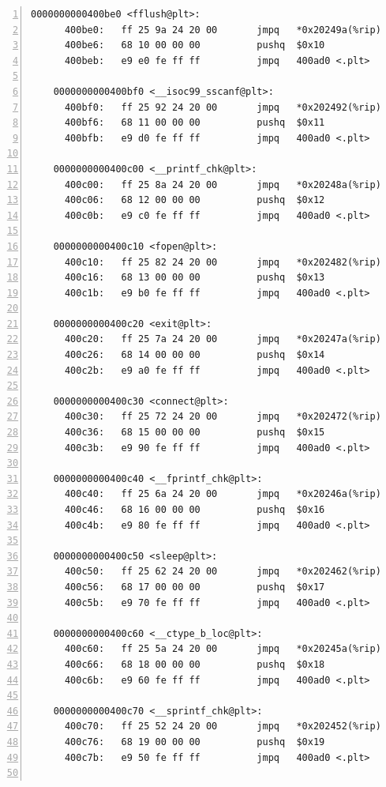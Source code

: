 \documentclass{article}
\begin{document}
\begin{lstlisting}[title = bomb的反汇编代码及部分注释, xleftmargin = 2em,xrightmargin = 2em, aboveskip = 1em, numbers = left, basicstyle=\scriptsize\ttfamily, numberstyle=\scriptsize]
    0000000000400be0 <fflush@plt>:
      400be0:	ff 25 9a 24 20 00    	jmpq   *0x20249a(%rip)        # 603080 <fflush@GLIBC_2.2.5>
      400be6:	68 10 00 00 00       	pushq  $0x10
      400beb:	e9 e0 fe ff ff       	jmpq   400ad0 <.plt>
    
    0000000000400bf0 <__isoc99_sscanf@plt>:
      400bf0:	ff 25 92 24 20 00    	jmpq   *0x202492(%rip)        # 603088 <__isoc99_sscanf@GLIBC_2.7>
      400bf6:	68 11 00 00 00       	pushq  $0x11
      400bfb:	e9 d0 fe ff ff       	jmpq   400ad0 <.plt>
    
    0000000000400c00 <__printf_chk@plt>:
      400c00:	ff 25 8a 24 20 00    	jmpq   *0x20248a(%rip)        # 603090 <__printf_chk@GLIBC_2.3.4>
      400c06:	68 12 00 00 00       	pushq  $0x12
      400c0b:	e9 c0 fe ff ff       	jmpq   400ad0 <.plt>
    
    0000000000400c10 <fopen@plt>:
      400c10:	ff 25 82 24 20 00    	jmpq   *0x202482(%rip)        # 603098 <fopen@GLIBC_2.2.5>
      400c16:	68 13 00 00 00       	pushq  $0x13
      400c1b:	e9 b0 fe ff ff       	jmpq   400ad0 <.plt>
    
    0000000000400c20 <exit@plt>:
      400c20:	ff 25 7a 24 20 00    	jmpq   *0x20247a(%rip)        # 6030a0 <exit@GLIBC_2.2.5>
      400c26:	68 14 00 00 00       	pushq  $0x14
      400c2b:	e9 a0 fe ff ff       	jmpq   400ad0 <.plt>
    
    0000000000400c30 <connect@plt>:
      400c30:	ff 25 72 24 20 00    	jmpq   *0x202472(%rip)        # 6030a8 <connect@GLIBC_2.2.5>
      400c36:	68 15 00 00 00       	pushq  $0x15
      400c3b:	e9 90 fe ff ff       	jmpq   400ad0 <.plt>
    
    0000000000400c40 <__fprintf_chk@plt>:
      400c40:	ff 25 6a 24 20 00    	jmpq   *0x20246a(%rip)        # 6030b0 <__fprintf_chk@GLIBC_2.3.4>
      400c46:	68 16 00 00 00       	pushq  $0x16
      400c4b:	e9 80 fe ff ff       	jmpq   400ad0 <.plt>
    
    0000000000400c50 <sleep@plt>:
      400c50:	ff 25 62 24 20 00    	jmpq   *0x202462(%rip)        # 6030b8 <sleep@GLIBC_2.2.5>
      400c56:	68 17 00 00 00       	pushq  $0x17
      400c5b:	e9 70 fe ff ff       	jmpq   400ad0 <.plt>
    
    0000000000400c60 <__ctype_b_loc@plt>:
      400c60:	ff 25 5a 24 20 00    	jmpq   *0x20245a(%rip)        # 6030c0 <__ctype_b_loc@GLIBC_2.3>
      400c66:	68 18 00 00 00       	pushq  $0x18
      400c6b:	e9 60 fe ff ff       	jmpq   400ad0 <.plt>
    
    0000000000400c70 <__sprintf_chk@plt>:
      400c70:	ff 25 52 24 20 00    	jmpq   *0x202452(%rip)        # 6030c8 <__sprintf_chk@GLIBC_2.3.4>
      400c76:	68 19 00 00 00       	pushq  $0x19
      400c7b:	e9 50 fe ff ff       	jmpq   400ad0 <.plt>
    

\end{lstlisting}
\end{document}
